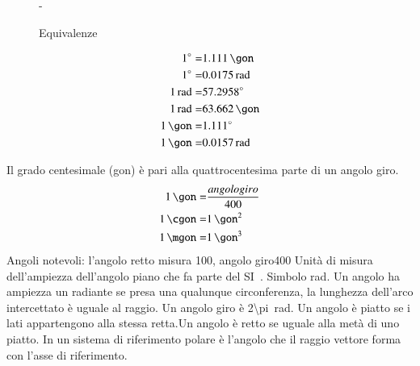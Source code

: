 \begin{figure}%
	\def\FrameCommand{\fboxsep=\FrameSep \colorbox{shadecolor}}%
	\begin{MakeFramed}{\advance\hsize-\width \FrameRestore}%
		\begin{center}%
			\textcolor{StrongGray}{\textsf{Equivalenze }}%
			\par%
			\vspace*{-\smallskipamount}%
			\vrule height 0.8pt width 56mm%
		\end{center}%
		\begin{small}%
			\begin{align*}
			\SI{1}{\degree}=&\SI{1.111}{\gon}\\
			\SI{1}{\degree}=&\SI{0.0175}{\radian}\\
			\SI{1}{\radian}=&\SI{57.2958}{\degree}\\
			\SI{1}{\radian}=&\SI{63.662}{\gon}\\
			\SI{1}{\gon}=&\SI{1.111}{\degree}\\
			\SI{1}{\gon}=&\SI{0.0157}{\radian}
			\end{align*}
		\end{small}%
		\vspace*{-\smallskipamount}%
	\end{MakeFramed}%
\end{figure}%
Il grado centesimale (gon) è pari alla quattrocentesima parte di un angolo giro.
\begin{align*}
\SI{1}{\gon}=&\dfrac{angolo giro}{400}\\
\SI{1}{\cgon}=&\SI{1}{\per\gon\tothe{2}}\\
\SI{1}{\mgon}=&\SI{1}{\per\gon\tothe{3}}
\end{align*}
Angoli notevoli: l'angolo retto misura \SI{100}{\gon}, angolo giro\SI{400}{\gon}
 Unità di misura dell'ampiezza dell'angolo piano che fa parte del SI\pointsto~. Simbolo rad. Un angolo ha ampiezza un radiante se presa una qualunque circonferenza, la lunghezza dell'arco intercettato è uguale al raggio. Un angolo giro è \SI{2\pi}{\radian}.
Un angolo è piatto se i lati appartengono alla stessa retta.Un angolo è retto se uguale alla metà di uno piatto.
In un sistema di riferimento polare è l'angolo che il raggio vettore forma con l'asse di riferimento.
